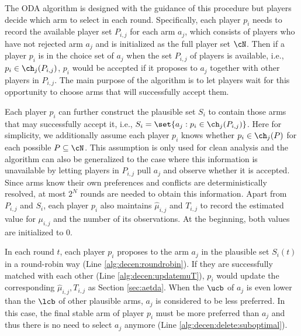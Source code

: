 The ODA algorithm is designed with the guidance of this procedure but players decide which arm to select in each round. 
Specifically, each player $p_i$ needs to record the available player set $P_{i,j}$ for each arm $a_j$, which consists of players who have not rejected arm $a_j$ and is initialized as the full player set $\cN$. 
Then if a player $p_i$ is in the choice set of $a_j$ when the set $P_{i,j}$ of players is available, i.e., $p_{i} \in \ch_j(P_{i,j})$,  $p_i$ would be accepted if it proposes to $a_j$ together with other players in $P_{i,j}$. 
The main purpose of the algorithm is to let players wait for this opportunity to choose arms that will successfully accept them. 



Each player $p_i$ can further construct the plausible set $S_i$ to contain those arms that may successfully accept it, i.e., $S_i = \set{ a_j: p_i \in \ch_j(P_{i,j})}$.  
Here for simplicity, we additionally assume each player $p_i$ knows whether $p_i \in \ch_j(P)$ for each possible $P\subseteq \cN$. This assumption is only used for clean analysis and the algorithm can also be generalized to the case where this information is unavailable by letting players in $P_{i,j}$ pull $a_j$ and observe whether it is accepted. Since arms know their own preferences and conflicts are deterministically resolved, at most $2^N$ rounds are needed to obtain this information.
Apart from $P_{i,j}$ and $S_i$, each player $p_i$ also maintains $\hat{\mu}_{i,j}$ and $T_{i,j}$ to record the estimated value for $\mu_{i,j}$ and the number of its observations. At the beginning, both values are initialized to $0$. 


In each round $t$, each player $p_i$ proposes to the arm $a_j$ in the plausible set $S_i(t)$ in a round-robin way (Line \ref{alg:decen:roundrobin}). If they are successfully matched with each other (Line \ref{alg:decen:updatemuT}), $p_i$ would update the corresponding $\hat{\mu}_{i,j}, T_{i,j}$ as Section \ref{sec:aetda}. 
When the $\ucb$ of $a_j$ is even lower than the $\lcb$ of other plausible arms, $a_j$ is considered to be less preferred. 
In this case, the final stable arm of player $p_i$ must be more preferred than $a_j$ and thus there is no need to select $a_j$ anymore (Line \ref{alg:decen:delete:suboptimal}). 



